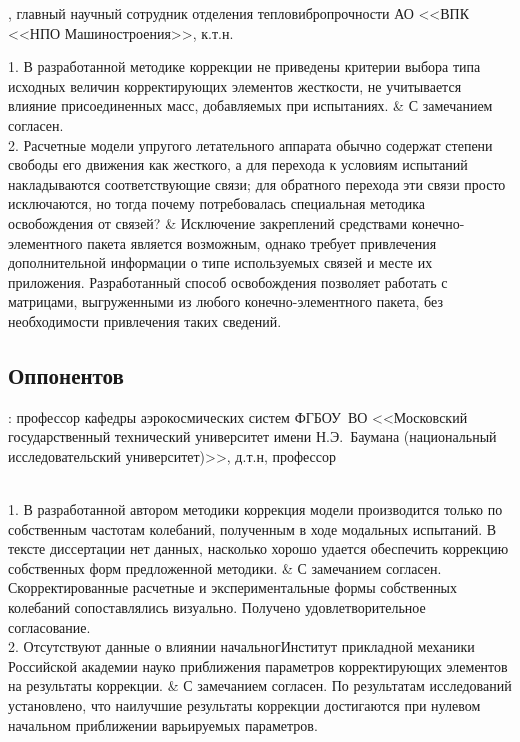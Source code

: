 \begin{frame}
	\beginSkip
	, главный научный сотрудник отделения тепловибропрочности АО <<ВПК <<НПО Машиностроения>>, к.т.н.
	\begin{comtblr}{15em}
		1. В разработанной методике коррекции не приведены критерии выбора типа исходных величин корректирующих элементов жесткости, не учитывается влияние присоединенных масс, добавляемых при испытаниях.
		&
		С замечанием согласен. \\
		2. Расчетные модели упругого летательного аппарата обычно содержат степени свободы его движения как жесткого, а для перехода к условиям испытаний накладываются соответствующие связи; для обратного перехода эти связи просто исключаются, но тогда почему потребовалась специальная методика освобождения от связей?
		&
		Исключение закреплений средствами конечно-элементного пакета является возможным, однако требует привлечения дополнительной информации о типе используемых связей и месте их приложения. Разработанный способ освобождения позволяет работать с матрицами, выгруженными из любого конечно-элементного пакета, без необходимости привлечения таких сведений.
	\end{comtblr}
\end{frame}

\subsection{Оппонентов}

\begin{frame}
	\beginSkip
	: профессор кафедры аэрокосмических систем ФГБОУ~ВО <<Московский государственный технический университет имени Н.Э.~Баумана (национальный исследовательский университет)>>, д.т.н, профессор \\
	 \\
		\begin{comtblr}{18em}
		1. В разработанной автором методики коррекция модели производится только по собственным частотам колебаний, полученным в ходе модальных испытаний. В тексте диссертации нет данных, насколько хорошо удается обеспечить коррекцию собственных форм предложенной методики.
		&
		С замечанием согласен. Скорректированные расчетные и экспериментальные формы собственных колебаний сопоставлялись визуально. Получено удовлетворительное согласование. \\
		2. Отсутствуют данные о влиянии начальногИнститут прикладной механики Российской академии науко приближения параметров корректирующих элементов на результаты коррекции.
		&
		С замечанием согласен. По результатам исследований установлено, что наилучшие результаты коррекции достигаются при нулевом начальном приближении варьируемых параметров. 
	\end{comtblr}
\end{frame}

